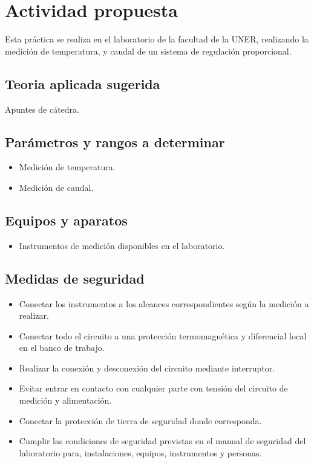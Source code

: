 \documentclass[12pt]{article}
\begin{document}
\section{Actividad propuesta}
Esta práctica se realiza en el laboratorio de la facultad de la UNER, realizando la medición de temperatura, y caudal de un sistema de regulación proporcional.

\subsection{Teoria aplicada sugerida}
Apuntes de cátedra.

\subsection{Parámetros y rangos a determinar}
\begin{itemize}
	\item Medición de temperatura.
	\item Medición de caudal.
\end{itemize}

\subsection{Equipos y aparatos}
\begin{itemize}
	\item Instrumentos de medición disponibles en el laboratorio.
\end{itemize}

\subsection{Medidas de seguridad}
\begin{itemize}
	\item Conectar los instrumentos a los alcances correspondientes según la medición a realizar.
	\item Conectar todo el circuito a una protección termomagnética y diferencial local en el banco de trabajo.
	\item Realizar la conexión y desconexión del circuito mediante interruptor.
	\item Evitar entrar en contacto con cualquier parte con tensión del circuito de medición y alimentación.
	\item Conectar la protección de tierra de seguridad donde corresponda.
	\item Cumplir las condiciones de seguridad previstas en el manual de seguridad del laboratorio para, instalaciones, equipos, instrumentos y personas. 
\end{itemize}
\end{document}
